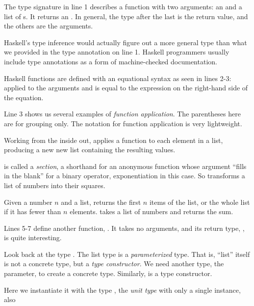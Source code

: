 \begin{notelist}
    \item The type signature in line 1 describes a function with two arguments: an  and a list
          of s. It returns an . In general, the type after the last \code{->}
          is the return value, and the others are the arguments.
    \item Haskell's type inference would actually figure out a more general type than what we provided in the type
          annotation on line 1. Haskell programmers usually include type annotations as a form of machine-checked
          documentation.
    \item Haskell functions are defined with an equational syntax as seen in lines 2-3: 
          applied to the arguments  and  is equal to the expression on the
          right-hand side of the equation.
    \item Line 3 shows us several examples of \textit{function application}. The parentheses here are for grouping
          only. The notation for function application is very lightweight.
    \item Working from the inside out,  applies a function to each element in a list, producing a new 
          new list containing the resulting values.
    \item {} is called a \textit{section}, a shorthand for an anonymous function whose argument
          ``fills in the blank'' for a binary operator, exponentiation in this case. So 
          transforms a list of numbers into their squares.
    \item Given a number $n$ and a list,  returns the first $n$ items of the list, or the whole list
          if it has fewer than $n$ elements.  takes a list of numbers and returns the sum.
    \item Lines 5-7 define another function, . It takes no arguments, and its return type, ,
          is quite interesting.
    \item Look back at the type \code{[Integer]}. The list type \code{[]} is a
          \textit{parameterized} type. That is, ``list'' itself is not a concrete type, but a \textit{type constructor}.
          We need another type, the parameter, to create a concrete type. Similarly,  is a type constructor.
    \item Here we instantiate it with the type \code{()}, the \textit{unit type} with only a single instance, also

\end{notelist}
